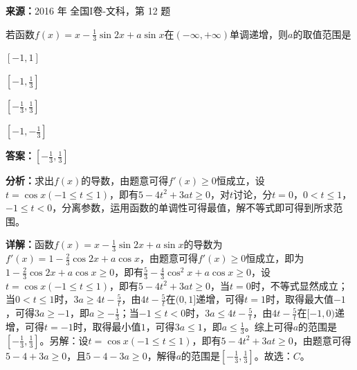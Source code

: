 \begin{question}[points=5]
\textbf{来源：}2016 年 全国I卷-文科，第 12 题\par
若函数$f(x)=x-\frac{1}{3}\sin2x+a\sin x$在$(-\infty,+\infty)$单调递增，则$a$的取值范围是
\begin{choices}
  \item $[-1,1]$
  \item $[-1,\frac{1}{3}]$
  \item $[-\frac{1}{3},\frac{1}{3}]$
  \item $[-1,-\frac{1}{3}]$
\end{choices}
\begin{solution}
\textbf{答案：}$[-\frac{1}{3},\frac{1}{3}]$

\textbf{分析：}求出$f(x)$的导数，由题意可得$f'(x)\ge0$恒成立，设$t=\cos x(-1\le t\le1)$，即有$5-4t^2+3at\ge0$，对$t$讨论，分$t=0$，$0<t\le1$，$-1\le t<0$，分离参数，运用函数的单调性可得最值，解不等式即可得到所求范围。

\textbf{详解：}函数$f(x)=x-\frac{1}{3}\sin2x+a\sin x$的导数为$f'(x)=1-\frac{2}{3}\cos2x+a\cos x$，由题意可得$f'(x)\ge0$恒成立，即为$1-\frac{2}{3}\cos2x+a\cos x\ge0$，即有$\frac{5}{3}-\frac{4}{3}\cos^2x+a\cos x\ge0$，设$t=\cos x(-1\le t\le1)$，即有$5-4t^2+3at\ge0$，当$t=0$时，不等式显然成立；当$0<t\le1$时，$3a\ge4t-\frac{5}{t}$，由$4t-\frac{5}{t}$在$(0,1]$递增，可得$t=1$时，取得最大值$-1$，可得$3a\ge-1$，即$a\ge-\frac{1}{3}$；当$-1\le t<0$时，$3a\le4t-\frac{5}{t}$，由$4t-\frac{5}{t}$在$[-1,0)$递增，可得$t=-1$时，取得最小值$1$，可得$3a\le1$，即$a\le\frac{1}{3}$。综上可得$a$的范围是$[-\frac{1}{3},\frac{1}{3}]$。另解：设$t=\cos x(-1\le t\le1)$，即有$5-4t^2+3at\ge0$，由题意可得$5-4+3a\ge0$，且$5-4-3a\ge0$，解得$a$的范围是$[-\frac{1}{3},\frac{1}{3}]$。故选：$C$。
\end{solution}
\end{question}

